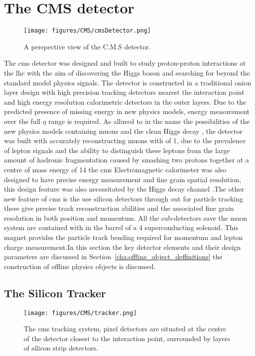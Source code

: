 \chapter{The CMS detector} %
\label{cha:the_cms_detector}
\begin{figure}[htbp]
  \centering
    \texttt{[image: figures/CMS/cmsDetector.png]}
  \caption{A perspective view of the C.M.S detector\cite{cms-sketchup}.}
  \label{fig:figures_CMS_cmsDetector}
\end{figure}

The \ac{cms} detector was designed and built to study proton-proton 
interactions at the \ac{lhc} with the aim of discovering the Higgs boson and 
searching for beyond the standard model physics signals. The detector is 
constructed in a traditional onion layer design with high precision tracking 
detectors nearest the interaction point and high energy resolution calorimetric 
detectors in the outer layers. Due to the predicted presence of missing energy 
\MET in new physics models, energy measurement over the full $\eta$ range is 
required. As allured to in the name the possibilities of the new physics models 
containing muons and the clean Higgs decay 
\HepProcess{\PH\to\PZ\PZ\to\Pmu\Pmu\Pmu\Pmu}, the detector was built with 
accurately reconstructing muons with \PT of \unit{1}{\TeV}, due to the 
prevalence of lepton signals and the ability to distinguish these leptons from 
the large amount of hadronic fragmentation caused by smashing two protons 
together at a centre of mass energy of \unit{14}{\TeV} the \ac{cms} 
Electromagnetic calorimeter was also designed to have precise energy 
measurement and fine grain spatial resolution, this design feature was also 
necessitated by the Higgs decay channel \HepProcess{\PH\to\Pphoton\Pphoton}.The 
other new feature of \ac{cms} is the use silicon detectors through out for 
particle tracking these give precise track reconstruction abilities and the 
associated fine grain resolution in both position and momentum. All the 
sub-detectors save the muon system are contained with in the barrel of a 
\unit{4}{\tesla} superconducting solenoid. This magnet provides the particle 
track bending required for momentum and lepton charge measurement.In this 
section the key detector elements and their design parameters are discussed in 
Section~\ref{cha:offline_object_deffinitions} the construction of offline 
physics objects is discussed.

\section{The Silicon Tracker} %
\label{sec:the_silicon_tracker}
\begin{figure}[htbp]
  \centering
    \texttt{[image: figures/CMS/tracker.png]}
  \caption{The \ac{cms} tracking system, pixel detectors are situated at the centre of the detector closest to the interaction point, surrounded by layers of silicon strip detectors\cite{cms-sketchup}.}
  \label{fig:figures_CMS_tracker}
\end{figure}

